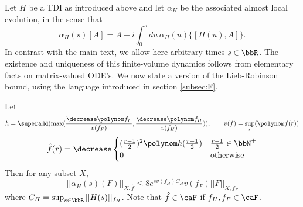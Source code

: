 Let $H$ be a TDI as introduced above and let $\alpha_H$ be the associated almost local evolution, in the sense that 
$$
\alpha_H(s)[A]=A+i\int_0^s du \,  \alpha_H(u)\{[H(u),A]\}.
$$
In contrast with the main text, we allow here arbitrary times $s \in \bbR$. 
The existence and uniqueness of this finite-volume dynamics follows from elementary facts on matrix-valued ODE's. We now state a version of the Lieb-Robinson bound, using the language introduced in section \ref{subsec:F}.  
\begin{lemma} \label{lem: bounds on evolved}
	Let
	\begin{equation} \label{eq: def h}
		h=\superadd (  \max( \frac{\decrease\polynom f_F}{v( f_F)}, \frac{  \decrease\polynom f_H}{v(f_H)}) ), \qquad  v(f)= \sup_r (\polynom f(r))
	\end{equation}   
	\begin{equation} \label{eq: def f prime}
		\hat f(r)= \decrease \begin{cases}  (\tfrac{r-1}{2})^2 \polynom h(\tfrac{r-1}{2})  & \tfrac{r-1}{2} \in \bbN^+ \\  0  & \text{otherwise} \end{cases}
	\end{equation}
	Then for any subset $X$,
	$$
	||  \alpha_{H}(s)(F) ||_{X,\hat f} \leq 8 e^{ s v(f_H) C_H}   v( f_F)  ||F||_{X,f_F}
	$$
	where $C_H = \sup_{s \in \bbR}||H(s)||_{f_H}$. Note that  $\hat f \in \caF$ if  $f_H, f_F \in\caF$.
\end{lemma}

